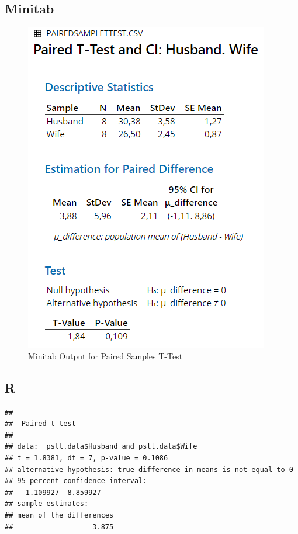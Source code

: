 \documentclass[
]{book}
\newenvironment{Shaded}{\begin{snugshade}}{\end{snugshade}}
\newcommand{\DataTypeTok}[1]{\textcolor[rgb]{0.13,0.29,0.53}{#1}}
\newcommand{\KeywordTok}[1]{\textcolor[rgb]{0.13,0.29,0.53}{\textbf{#1}}}
\newcommand{\NormalTok}[1]{#1}
\newcommand{\OperatorTok}[1]{\textcolor[rgb]{0.81,0.36,0.00}{\textbf{#1}}}
\begin{document}
\hypertarget{minitab-2}{%
\subsection{Minitab}\label{minitab-2}}

\begin{figure}[!h]
\includegraphics{Screenshots/Paired Samples T test/psttMinitab} \caption{\label{fig:psttMinitab}Minitab Output for Paired Samples T-Test}\label{fig:psttMinitab}
\end{figure}

\hypertarget{r-2}{%
\subsection{R}\label{r-2}}

\begin{Shaded}
\end{Shaded}

\begin{verbatim}
## 
## 	Paired t-test
## 
## data:  pstt.data$Husband and pstt.data$Wife
## t = 1.8381, df = 7, p-value = 0.1086
## alternative hypothesis: true difference in means is not equal to 0
## 95 percent confidence interval:
##  -1.109927  8.859927
## sample estimates:
## mean of the differences 
##                   3.875
\end{verbatim}
\end{document}
